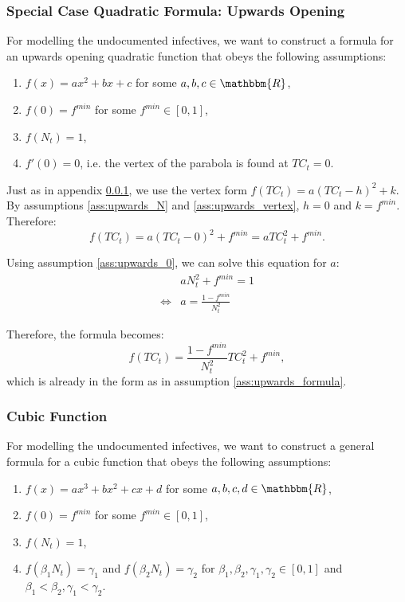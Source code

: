 \documentclass[12pt]{article}
\newcommand{\R}{\mathbbm{R}}
\begin{document}
\begin{appendices}
		\subsubsection{Special Case Quadratic Formula: Upwards Opening} \label{ssapp:upwards_derivation_vertex}
		For modelling the undocumented infectives, we want to construct a formula for an upwards opening quadratic function that obeys the following assumptions:
		\begin{enumerate}[label=(\Roman*)]
		    \item\label{ass:upwards_formula} $f(x) = ax^2 + bx + c$  for some $a, b, c \in \R$,
		    \item\label{ass:upwards_0} $f(0) = f^{min}$ for some $f^{min} \in [0,1]$,
		    \item\label{ass:upwards_N} $f(N_t) = 1$,
		    \item\label{ass:upwards_vertex} $f'(0) = 0$, i.e. the vertex of the parabola is found at $TC_t = 0$.
		\end{enumerate}
		
		Just as in appendix \ref{ssapp:upwards_derivation_vertex}, we use the vertex form $f(TC_t) = a(TC_t - h)^2 + k$. By assumptions \ref{ass:upwards_N} and \ref{ass:upwards_vertex}, $h=0$ and $k=f^{min}$. Therefore:
		    \[f(TC_t) = a(TC_t - 0)^2 + f^{min} = aTC_t^2 + f^{min}.\]
		    
		\noindent Using assumption \ref{ass:upwards_0}, we can solve this equation for $a$:
		    \begin{align*}
		             & aN_t^2 + f^{min} = 1\\
		        \iff & a = \frac{1 - f^{min}}{N_t^2}
		    \end{align*}
		    
		\noindent Therefore, the formula becomes:
		    \[f(TC_t) = \frac{1 - f^{min}}{N_t^2}TC_t^2 + f^{min},\]
		which is already in the form as in assumption \ref{ass:upwards_formula}.
		
		\subsubsection{Cubic Function} \label{ssapp:cubic_derivation}
		For modelling the undocumented infectives, we want to construct a general formula for a cubic function that obeys the following assumptions:
		\begin{enumerate}[label=(\Roman*)]
		    \item\label{ass:cubic_formula} $f(x) = ax^3 + bx^2 + cx + d$  for some $a, b, c, d \in \R$,
		    \item\label{ass:cubic_0} $f(0) = f^{min}$ for some $f^{min} \in [0,1]$,
		    \item\label{ass:cubic_N} $f(N_t) = 1$,
		    \item\label{ass:cubic_betaN} $f(\beta_1 N_t) = \gamma_1$ and $f(\beta_2 N_t) = \gamma_2$ for $\beta_1, \beta_2, \gamma_1, \gamma_2 \in [0,1]$ and $\beta_1 < \beta_2, \gamma_1 < \gamma_2$.
		\end{enumerate}
		

\end{appendices}
\end{document}

